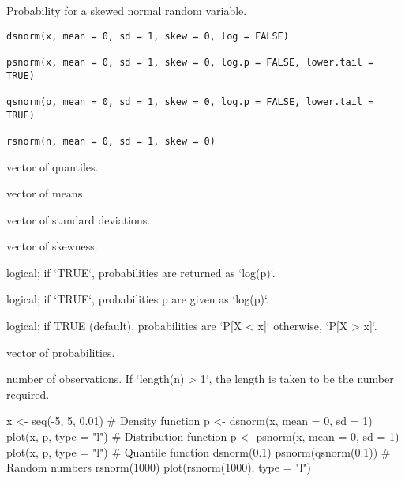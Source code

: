\documentclass[a4paper]{book}
\begin{document}
%
\begin{Description}\relax
Probability for a skewed normal random variable.
\end{Description}
%
\begin{Usage}
\begin{verbatim}
dsnorm(x, mean = 0, sd = 1, skew = 0, log = FALSE)

psnorm(x, mean = 0, sd = 1, skew = 0, log.p = FALSE, lower.tail = TRUE)

qsnorm(p, mean = 0, sd = 1, skew = 0, log.p = FALSE, lower.tail = TRUE)

rsnorm(n, mean = 0, sd = 1, skew = 0)
\end{verbatim}
\end{Usage}
%
\begin{Arguments}
\begin{ldescription}
\item[\code{x}] vector of quantiles.

\item[\code{mean}] vector of means.

\item[\code{sd}] vector of standard deviations.

\item[\code{skew}] vector of skewness.

\item[\code{log}] logical; if `TRUE`, probabilities are returned as `log(p)`.

\item[\code{log.p}] logical; if `TRUE`, probabilities p are given as `log(p)`.

\item[\code{lower.tail}] logical; if TRUE (default), probabilities are `P[X < x]` otherwise, `P[X > x]`.

\item[\code{p}] vector of probabilities.

\item[\code{n}] number of observations. If `length(n) > 1`, the length is taken to be the number required.
\end{ldescription}
\end{Arguments}
%
\begin{Examples}
\begin{ExampleCode}
x <- seq(-5, 5, 0.01)
# Density function
p <- dsnorm(x, mean = 0, sd = 1)
plot(x, p, type = "l")
# Distribution function
p <- psnorm(x, mean = 0, sd = 1)
plot(x, p, type = "l")
# Quantile function
dsnorm(0.1)
psnorm(qsnorm(0.1))
# Random numbers
rsnorm(1000)
plot(rsnorm(1000), type = "l")

\end{ExampleCode}
\end{Examples}
\end{document}
